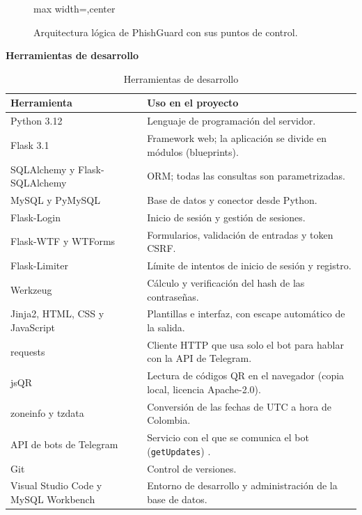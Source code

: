 \documentclass[journal,onecolumn,12pt,draftclsnofoot]{IEEEtran}
\newcommand{\apartado}[1]{\par\medskip\noindent\textbf{#1}\par\smallskip}
\begin{document}
\begin{figure}[htbp]
\begin{adjustbox}{max width=\textwidth,center}
\end{adjustbox}
\caption{Arquitectura lógica de PhishGuard con sus puntos de control.}
\end{figure}

\apartado{Herramientas de desarrollo}

\begin{table}[htbp]
\centering
\caption{Herramientas de desarrollo}\label{tab:herramientas}
\small
\setlength{\tabcolsep}{4pt}
\begin{tabular}{|p{}|p{}|}
\hline
\textbf{Herramienta} & \textbf{Uso en el proyecto} \\ \hline
Python 3.12 & Lenguaje de programación del servidor. \\ \hline
Flask 3.1 & Framework web; la aplicación se divide en módulos (blueprints). \\ \hline
SQLAlchemy y Flask-SQLAlchemy & ORM; todas las consultas son parametrizadas. \\ \hline
MySQL y PyMySQL & Base de datos y conector desde Python. \\ \hline
Flask-Login & Inicio de sesión y gestión de sesiones. \\ \hline
Flask-WTF y WTForms & Formularios, validación de entradas y token CSRF. \\ \hline
Flask-Limiter & Límite de intentos de inicio de sesión y registro. \\ \hline
Werkzeug & Cálculo y verificación del hash de las contraseñas. \\ \hline
Jinja2, HTML, CSS y JavaScript & Plantillas e interfaz, con escape automático de la salida. \\ \hline
requests & Cliente HTTP que usa solo el bot para hablar con la API de Telegram. \\ \hline
jsQR & Lectura de códigos QR en el navegador (copia local, licencia Apache-2.0). \\ \hline
zoneinfo y tzdata & Conversión de las fechas de UTC a hora de Colombia. \\ \hline
API de bots de Telegram & Servicio con el que se comunica el bot (\texttt{getUpdates}) \cite{telegram}. \\ \hline
Git & Control de versiones. \\ \hline
Visual Studio Code y MySQL Workbench & Entorno de desarrollo y administración de la base de datos. \\ \hline
\end{tabular}
\end{table}
\end{document}
